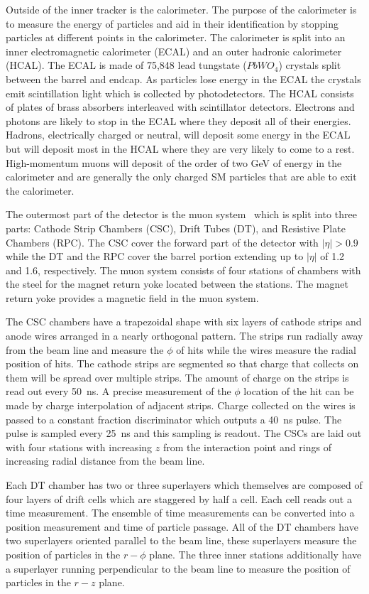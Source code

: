 Outside of the inner tracker is the calorimeter. The purpose of the calorimeter is to measure the energy of particles and aid in their identification by stopping
particles at different points in the calorimeter.  The calorimeter is split into an inner electromagnetic calorimeter (ECAL) and an outer hadronic calorimeter (HCAL). 
The ECAL is made of 75,848 lead tungstate ($PbWO_4$) crystals split between the barrel and endcap. As particles lose energy in the ECAL
the crystals emit scintillation light which is collected by photodetectors. The HCAL consists of plates of brass absorbers interleaved with scintillator
detectors.  Electrons and photons are likely to stop in the ECAL where they deposit all of their energies. Hadrons, electrically charged or neutral, will
deposit some energy in the ECAL but will deposit most in the HCAL where they are very likely to come to a rest. High-momentum muons will 
deposit of the order of two GeV of energy in the calorimeter and are generally the only charged SM particles that are able to exit the calorimeter.

The outermost part of the detector is the muon system~\cite{CMSMuonTDR} which is split into three parts:
Cathode Strip Chambers (CSC), Drift Tubes (DT), and Resistive Plate Chambers (RPC).
The CSC cover the forward part of the detector with $|\eta|>0.9$ while the DT and the RPC cover the barrel portion extending up to $|\eta|$ of 1.2 and 1.6, respectively.
The muon system consists of four stations of chambers with the steel for the magnet return yoke located between the stations. The magnet return yoke provides a magnetic field
in the muon system.

The CSC chambers have a trapezoidal shape with six layers of cathode strips and anode wires arranged in a nearly orthogonal pattern. 
The strips run radially away from the beam line and measure the $\phi$ of hits while the wires measure the radial position of hits.
The cathode strips are segmented so that charge that collects on them will be spread over multiple strips.
The amount of charge on the strips is read out every 50~ns. A precise measurement of the $\phi$ location of the hit can be made
by charge interpolation of adjacent strips. Charge collected on the wires
is passed to a constant fraction discriminator which outputs a 40~ns pulse. The pulse is sampled every 25~ns and this sampling is readout.
The CSCs are laid out with four stations with increasing $z$ from the interaction point and rings of increasing radial distance from the beam line.

Each DT chamber has two or three superlayers which themselves are composed of four layers of drift cells which are staggered by half a cell.
Each cell reads out a time measurement. The ensemble of time measurements can be converted into a position measurement and time of particle passage.
All of the DT chambers have two superlayers oriented parallel to the beam line, these superlayers measure the position of particles in the $r-\phi$ plane.
The three inner stations additionally have a superlayer running perpendicular to the beam line to measure the position of particles in the $r-z$ plane.

